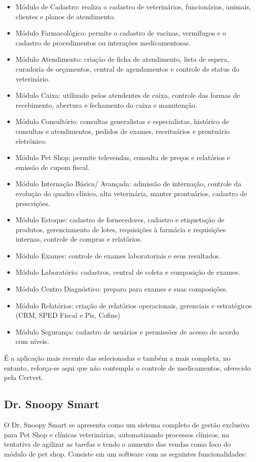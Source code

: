 \documentclass[
    12pt,               %
    openright,          %
    oneside,
    a4paper,            %
    BIBLATEX,           %
    TODO,               %
    english,            %
    brazil              %
    ]{ifsp-spo-inf-ctds}
\begin{document}
\begin{itemize}
    \item Módulo de Cadastro: realiza o cadastro de veterinários, funcionários, animais, clientes e planos de atendimento.
    \item Módulo Farmacológico: permite o cadastro de vacinas, vermífugos e o cadastro de procedimentos ou interações medicamentosas.
    \item Módulo Atendimento: criação de ficha de atendimento, lista de espera, curadoria de orçamentos, central de   agendamentos e controle de status do veterinário.
    \item Módulo Caixa: utilizado pelos atendentes de caixa, controle das formas de recebimento, abertura e fechamento do caixa e manutenção.
    \item Módulo Consultório: consultas generalistas e especialistas, histórico de consultas e atendimentos, pedidos de exames, receituários e prontuário eletrônico.
    \item Módulo Pet Shop: permite televendas, consulta de preços e relatórios e emissão de cupom fiscal.
    \item Módulo Internação Básica/ Avançada: admissão de internação, controle da evolução do quadro clínico, alta veterinária, manter prontuários, cadastro de prescrições.
    \item Módulo Estoque: cadastro de fornecedores, cadastro e etiquetação de produtos, gerenciamento de lotes, requisições à farmácia e requisições internas, controle de compras e relatórios.
    \item Módulo Exames: controle de exames laboratoriais e seus resultados.
    \item Módulo Laboratório: cadastros, central de coleta e composição de exames.
    \item Módulo Centro Diagnóstico: preparo para exames e suas composições.
    \item Módulo Relatórios: criação de relatórios operacionais, gerenciais e estratégicos (CRM, SPED Fiscal e Pis, Cofins)
    \item Módulo Segurança: cadastro de usuários e permissões de acesso de acordo com níveis.
\end{itemize}

É a aplicação mais recente das selecionadas e também a mais completa, no entanto, reforça-se aqui que não contempla o controle de medicamentos, oferecido pela Certvet.

\subsection{Dr. Snoopy Smart}
O Dr. Snoopy Smart se apresenta como um sistema completo de gestão exclusivo para Pet Shop e clínicas veterinárias, automatizando processos clínicos, na tentativa de agilizar as tarefas e tendo o aumento das vendas como foco do módulo de pet shop. Consiste em um software com as seguintes funcionalidades:
\end{document}
